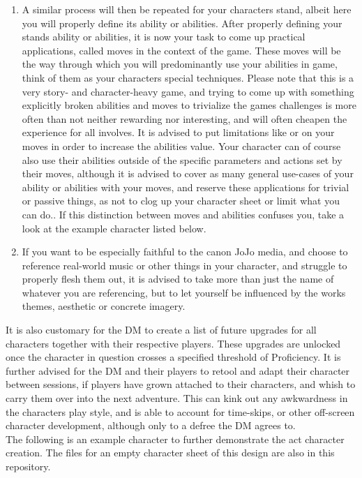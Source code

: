 \documentclass[a4paper,12pt]{article}
\begin{document}
\begin{enumerate}
		\item A similar process will then be repeated for your characters stand, albeit here you will properly define its ability or abilities. After properly defining your stands ability or abilities, it is now your task to come up practical applications, called moves in the context of the game. These moves will be the way through which you will predominantly use your abilities in game, think of them as your characters special techniques. Please note that this is a very story- and character-heavy game, and trying to come up with something explicitly broken abilities and moves to trivialize the games challenges is more often than not neither rewarding nor interesting, and will often cheapen the experience for all involves. It is advised to put limitations like  or  on your moves in order to increase the abilities value. Your character can of course also use their abilities outside of the specific parameters and actions set by their moves, although it is advised to cover as many general use-cases of your ability or abilities with your moves, and reserve these applications for trivial or passive things, as not to clog up your character sheet or limit what you can do.. If this distinction between moves and abilities confuses you, take a look at the example character listed below.
		\item If you want to be especially faithful to the canon JoJo media, and choose to reference real-world music or other things in your character, and struggle to properly flesh them out, it is advised to take more than just the name of whatever you are referencing, but to let yourself be influenced by the works themes, aesthetic or concrete imagery.
		
\end{enumerate}
It is also customary for the  DM to create a list of future upgrades for all characters together with their respective players. These upgrades are unlocked once the character in question crosses a specified threshold of Proficiency. It is further advised for the DM and their players to retool and adapt their character between sessions, if players have grown attached to their characters, and whish to carry them over into the next adventure. This can kink out any awkwardness in the characters play style, and is able to account for time-skips, or other off-screen character development, although only to a defree the DM agrees to.\\
The following is an example character to further demonstrate the act character creation. The files for an empty character sheet of this design are also in this repository.
\end{document}
